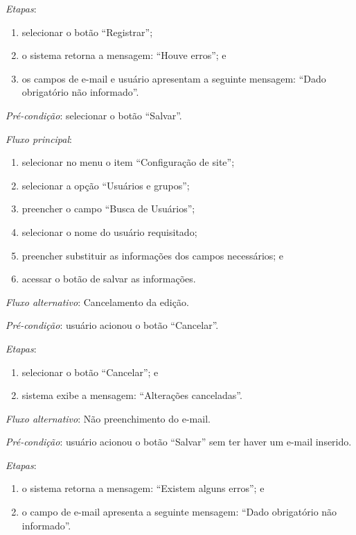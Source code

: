 \noindent \textit{Etapas}:

\begin{enumerate}
    \item selecionar o botão ``Registrar'';
    \item o sistema retorna a mensagem: ``Houve erros''; e
    \item os campos de e-mail e usuário apresentam a seguinte mensagem: ``Dado obrigatório não informado''.
\end{enumerate}


\vspace{0.7cm}

\noindent \textit{Pré-condição}: selecionar o botão ``Salvar''.

\noindent \textit{Fluxo principal}:

\begin{enumerate}
    \item selecionar no menu o item ``Configuração de site'';
    \item selecionar a opção ``Usuários e grupos'';
    \item preencher o campo ``Busca de Usuários'';
    \item selecionar o nome do usuário requisitado;
    \item preencher substituir as informações dos campos necessários; e
    \item acessar o botão de salvar as informações.
\end{enumerate}

\noindent \textit{Fluxo alternativo}: Cancelamento da edição.

\noindent \textit{Pré-condição}: usuário acionou o botão ``Cancelar''.

\noindent \textit{Etapas}:

\begin{enumerate}
    \item selecionar o botão ``Cancelar''; e
    \item sistema exibe a mensagem: ``Alterações canceladas''.
\end{enumerate}

\noindent \textit{Fluxo alternativo}: Não preenchimento do e-mail.

\noindent \textit{Pré-condição}: usuário acionou o botão ``Salvar'' sem ter haver um e-mail inserido.

\noindent \textit{Etapas}:

\begin{enumerate}
    \item o sistema retorna a mensagem: ``Existem alguns erros''; e
    \item o campo de e-mail apresenta a seguinte mensagem: ``Dado obrigatório não informado''.
\end{enumerate}




